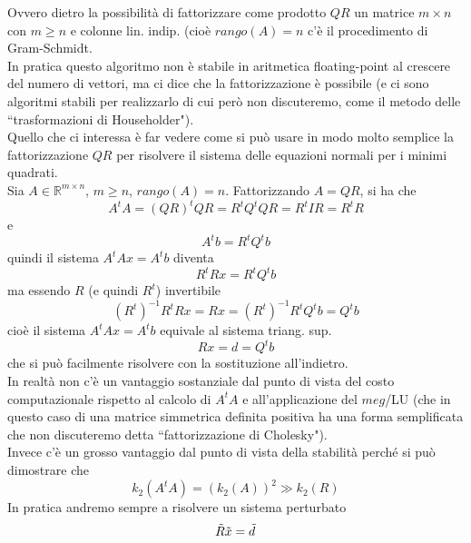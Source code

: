 \documentclass[12pt,a4paper]{article}
\begin{document}
Ovvero dietro la possibilità di fattorizzare come prodotto $QR$ un matrice $m\times n$ con $m\geq n$ e colonne lin. indip. (cioè $rango(A)=n$ c'è il procedimento di Gram-Schmidt. \\
In pratica questo algoritmo non è stabile in aritmetica floating-point al crescere del numero di vettori, ma ci dice che la fattorizzazione è possibile (e ci sono algoritmi stabili per realizzarlo di cui però non discuteremo, come il metodo delle ``trasformazioni di Householder").\\
Quello che ci interessa è far vedere come si può usare in modo molto semplice la fattorizzazione $QR$ per risolvere il sistema delle equazioni normali per i minimi quadrati. \\
Sia $A\in \mathbb{R}^{m\times n}$, $m\geq n$, $rango(A)=n$. Fattorizzando $A=QR$, si ha che
\begin{equation*}
    A^tA=(QR)^tQR=R^tQ^tQR=R^tIR=R^tR
\end{equation*}
e
\begin{equation*}
    A^tb=R^tQ^tb
\end{equation*}
quindi il sistema $A^tAx=A^tb$ diventa 
\begin{equation*}
    R^tRx=R^tQ^tb
\end{equation*}
ma essendo $R$ (e quindi $R^t$) invertibile
\begin{equation*}
    (R^t)^{-1}R^tRx=Rx=(R^t)^{-1}R^tQ^tb=Q^tb
\end{equation*}
cioè il sistema $A^tAx=A^tb$ equivale al sistema triang. sup.
\begin{equation*}
    Rx=d=Q^tb
\end{equation*}
che si può facilmente risolvere con la sostituzione all'indietro. \\
In realtà non c'è un vantaggio sostanziale dal punto di vista del costo computazionale rispetto al calcolo di $A^tA$ e all'applicazione del $meg$/LU (che in questo caso di una matrice simmetrica definita positiva ha una forma semplificata che non discuteremo detta ``fattorizzazione di Cholesky"). \\
Invece c'è un grosso vantaggio dal punto di vista della stabilità perché si può dimostrare che
\begin{equation*}
    k_2(A^tA)=(k_2(A))^2 \gg k_2(R)
\end{equation*}
In pratica andremo sempre a risolvere un sistema perturbato
\begin{equation*}
    \Tilde{R}\Tilde{x}=\Tilde{d}
\end{equation*}
\end{document}
